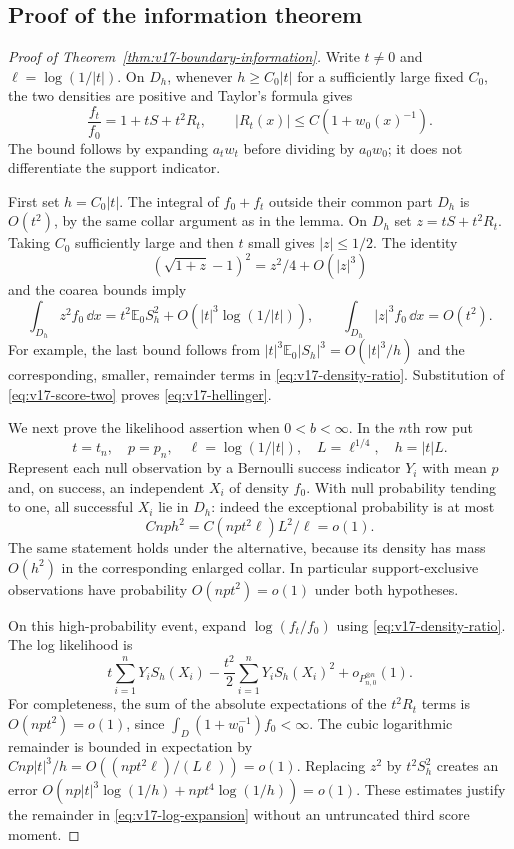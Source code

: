 \subsection{Proof of the information theorem}
\begin{proof}[Proof of Theorem~\ref{thm:v17-boundary-information}]
Write $t\ne0$ and $\ell=\log(1/|t|)$. On $D_h$, whenever
$h\ge C_0|t|$ for a sufficiently large fixed $C_0$, the two densities
are positive and Taylor's formula gives
\begin{equation}\label{eq:v17-density-ratio}
 \frac{f_t}{f_0}=1+tS+t^2R_t,
             \qquad |R_t(x)|\le C(1+w_0(x)^{-1}).
\end{equation}
The bound follows by expanding $a_t w_t$ before dividing by $a_0w_0$;
it does not differentiate the support indicator.

First set $h=C_0|t|$. The integral of $f_0+f_t$ outside their common
part $D_h$ is $O(t^2)$, by the same collar argument as in the lemma.
On $D_h$ set $z=tS+t^2R_t$. Taking $C_0$ sufficiently large and then
$t$ small gives $|z|\le1/2$. The identity
\[
             (\sqrt{1+z}-1)^2=z^2/4+O(|z|^3)
\]
and the coarea bounds imply
\[
 \int_{D_h}z^2 f_0\,\dd x
       =t^2\mathbb E_0S_h^2+O(|t|^3\log(1/|t|)),\qquad
 \int_{D_h}|z|^3f_0\,\dd x=O(t^2).
\]
For example, the last bound follows from
$|t|^3\mathbb E_0|S_h|^3=O(|t|^3/h)$ and the corresponding, smaller,
remainder terms in \eqref{eq:v17-density-ratio}. Substitution of
\eqref{eq:v17-score-two} proves \eqref{eq:v17-hellinger}.

We next prove the likelihood assertion when $0<b<\infty$. In the
$n$th row put
\[
 t=t_n,\quad p=p_n,\quad \ell=\log(1/|t|),\quad
               L=\ell^{1/4},\quad h=|t|L.
\]
Represent each null observation by a Bernoulli success indicator $Y_i$
with mean $p$ and, on success, an independent $X_i$ of density $f_0$.
With null probability tending to one, all successful $X_i$ lie in $D_h$:
indeed the exceptional probability is at most
\[
                   Cnp h^2=C(np t^2\ell)L^2/\ell=o(1).
\]
The same statement holds under the alternative, because its density
has mass $O(h^2)$ in the corresponding enlarged collar. In particular
support-exclusive observations have probability $O(np t^2)=o(1)$
under both hypotheses.

On this high-probability event, expand
$\log(f_t/f_0)$ using \eqref{eq:v17-density-ratio}. The log likelihood
is
\begin{equation}\label{eq:v17-log-expansion}
 t\sum_{i=1}^nY_iS_h(X_i)
       -\frac{t^2}{2}\sum_{i=1}^nY_iS_h(X_i)^2+o_{P_{n,0}^{\otimes n}}(1).
\end{equation}
For completeness, the sum of the absolute expectations of the
$t^2R_t$ terms is $O(np t^2)=o(1)$, since
$\int_D(1+w_0^{-1})f_0<\infty$. The cubic logarithmic remainder is
bounded in expectation by
$Cnp|t|^3/h=O((np t^2\ell)/(L\ell))=o(1)$.
Replacing $z^2$ by $t^2S_h^2$ creates an error
$O(np|t|^3\log(1/h)+np t^4\log(1/h))=o(1)$.
These estimates justify the remainder in \eqref{eq:v17-log-expansion}
without an untruncated third score moment.


\end{proof}
